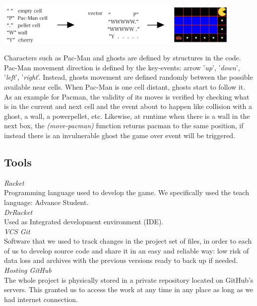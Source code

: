 \documentclass{article}
\begin{document}
\begin{center}
 \includegraphics[width=12cm]{./images/vector.jpeg}
\end{center}

Characters such as Pac-Man and ghosts are defined by structures in the code. Pac-Man movement direction is defined by the key-events: arrow '\textit{up}', '\textit{down}', '\textit{left}', '\textit{right}'.
Instead, ghosts movement are defined randomly between the possible available near cells. When Pac-Man is one cell distant, ghosts start to follow it.
As an example for Pacman, the validity of its moves is verified by checking what is in the current and next cell and the event about to happen like collision with a ghost, a wall, a powerpellet, etc. Likewise, at runtime when there is a wall in the next box, the \textit{(move-pacman)} function returns pacman to the same position, if instead there is an invulnerable ghost the game over event will be triggered.
 
\subsection{Tools}
 
\hspace{0.5cm}\textit{Racket}\\
Programming language used to develop the game.
We specifically used the teach language: Advance Student.\\
 

\textit{DrRacket}\\
Used as Integrated development environment (IDE).\\
 
\textit{VCS Git}\\
Software that we used to track changes in the project set of files, in order to each of us to develop source code and share it in an easy and reliable way: low risk of data loss and archives with the previous versions ready to back up if needed.\\

\textit{Hosting GitHub}\\
The whole project is physically stored in a private repository located on GitHub's servers. This granted us to access the work at any time in any place as long as we had internet connection.
\end{document}
